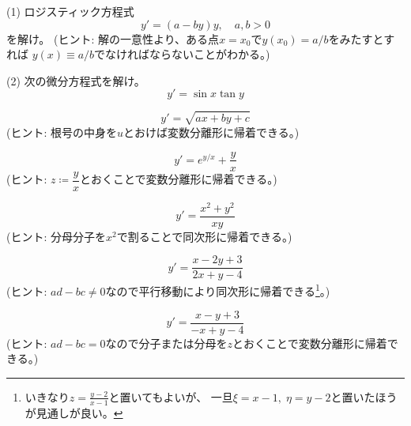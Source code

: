 \documentclass[report]{jlreq}
\begin{document}
\begin{problem}[2.1.2 変数分離形]
    (1) ロジスティック方程式
    \begin{equation}
        y' = (a - by) y,\quad a, b > 0
    \end{equation}
    を解け。
    (ヒント: 解の一意性より、ある点$x = x_0$で$y(x_0) = a/b$をみたすとすれば
    $y(x) \equiv a/b$でなければならないことがわかる。)

    (2) 次の微分方程式を解け。
    \begin{equation}
        y' = \sin x \tan y
    \end{equation}
\end{problem}

\begin{problem}
    \begin{equation}
        y' = \sqrt{ax + by + c}
    \end{equation}
    (ヒント: 根号の中身を$u$とおけば変数分離形に帰着できる。)
\end{problem}

\begin{problem}[2.2.1 同次形]
    \begin{equation}
        y' = e^{y/x} + \frac{y}{x}
    \end{equation}
    (ヒント: $z \coloneqq \dfrac{y}{x}$とおくことで変数分離形に帰着できる。)
\end{problem}

\begin{problem}[2.2.2]
    \begin{equation}
        y' = \frac{x^2 + y^2}{xy}
    \end{equation}
    (ヒント: 分母分子を$x^2$で割ることで同次形に帰着できる。)
\end{problem}

\begin{problem}[2.2.3]
    \begin{equation}
        y' = \frac{x - 2y + 3}{2x + y - 4}
    \end{equation}
    (ヒント: $ad - bc \neq 0$なので平行移動により同次形に帰着できる\footnote{
        いきなり$z = \frac{y - 2}{x - 1}$と置いてもよいが、
        一旦$\xi = x - 1,\; \eta = y - 2$と置いたほうが見通しが良い。
    }。)
\end{problem}

\begin{problem}[2.2.3']
    \begin{equation}
        y' = \frac{x - y + 3}{-x + y - 4}
    \end{equation}
    (ヒント: $ad - bc = 0$なので分子または分母を$z$とおくことで変数分離形に帰着できる。)
\end{problem}
\end{document}
